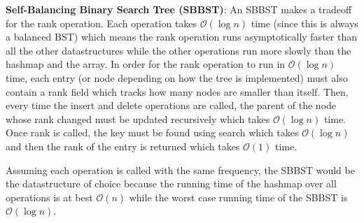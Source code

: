 \textbf{Self-Balancing Binary Search Tree (SBBST)}:
An SBBST makes a tradeoff for the rank operation. Each operation takes $\mathcal{O}(\log{n})$ time (since this is always a balanced BST) which means the rank operation runs asymptotically faster than all the other datastructures while the other operations run more slowly than the hashmap and the array. In order for the rank operation to run in $\mathcal{O}(\log{n})$ time, each entry (or node depending on how the tree is implemented) must also contain a rank field which tracks how many nodes are smaller than itself. Then, every time the insert and delete operations are called, the parent of the node whose rank changed must be updated recursively which takes $\mathcal{O}(\log{n})$ time. Once rank is called, the key must be found using search which takes $\mathcal{O}(\log{n})$ and then the rank of the entry is returned which takes $\mathcal{O}(1)$ time.

Assuming each operation is called with the same frequency, the SBBST would be the datastructure of choice because the running time of the hashmap over all operations is at best $\mathcal{O}(n)$ while the worst case running time of the SBBST is $\mathcal{O}(\log{n})$.